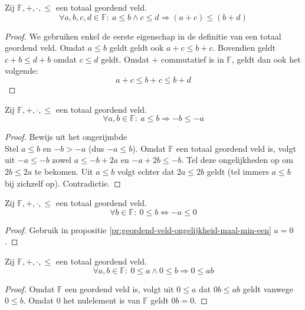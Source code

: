 \documentclass[main.tex]{subfiles}
\begin{document}
\begin{pr}
  \label{pr:geordend-veld-optelling-ongelijkheden}
  Zij $\mathbb{F},+,\cdot,\le$ een totaal geordend veld.
  \[ \forall a,b,c,d \in \mathbb{F}:\ a\le b \wedge c \le d \Rightarrow (a+c) \le (b+d) \]

  \begin{proof}
    We gebruiken enkel de eerste eigenschap in de definitie van een totaal geordend veld.
    Omdat $a\le b$ geldt geldt ook $a + c \le b+c$.
    Bovendien geldt $c+b \le d+b$ omdat $c\le d$ geldt.
    Omdat $+$ commutatief is in $\mathbb{F}$, geldt dan ook het volgende:
    \[ a+c \le b+c \le b+d\]
  \end{proof}
\end{pr}

\begin{pr}
  \label{pr:geordend-veld-ongelijkheid-maal-min-een}
  Zij $\mathbb{F},+,\cdot,\le$ een totaal geordend veld.
  \[ \forall a,b\in \mathbb{F}:\ a \le b \Rightarrow -b \le -a \]

  \begin{proof}
    Bewijs uit het ongerijmbde\\
    Stel $a \le b$ en $-b > -a$ (dus $-a \le b$).
    Omdat $\mathbb{F}$ een totaal geordend veld is, volgt uit $-a \le -b$ zowel $a \le -b+2a$ en $-a+2b \le -b$.
    Tel deze ongelijkheden op om $2b \le 2a$ te bekomen.
    Uit $a\le b$ volgt echter dat $2a \le 2b$ geldt (tel immers $a\le b$ bij zichzelf op).
    Contradictie.
  \end{proof}
\end{pr}

\begin{pr}
  Zij $\mathbb{F},+,\cdot,\le$ een totaal geordend veld.
  \[ \forall b \in \mathbb{F}:\ 0 \le b \Leftrightarrow -a \le 0 \]

  \begin{proof}
    Gebruik in propositie \ref{pr:geordend-veld-ongelijkheid-maal-min-een} $a=0$.
  \end{proof}
\end{pr}

\begin{pr}
  \label{pr:geordend-veld-ongelijkheid-vermenigvuldiging}
  Zij $\mathbb{F},+,\cdot,\le$ een totaal geordend veld.
  \[ \forall a,b \in \mathbb{F}:\ 0 \le a \wedge 0 \le b \Rightarrow 0 \le ab \]

  \begin{proof}
    Omdat $\mathbb{F}$ een geordend veld is, volgt uit $0\le a$ dat $0b \le ab$ geldt vanwege $0 \le b$.
    Omdat $0$ het nulelement is van $\mathbb{F}$ geldt $0b = 0$.
  \end{proof}
\end{pr}
\end{document}
